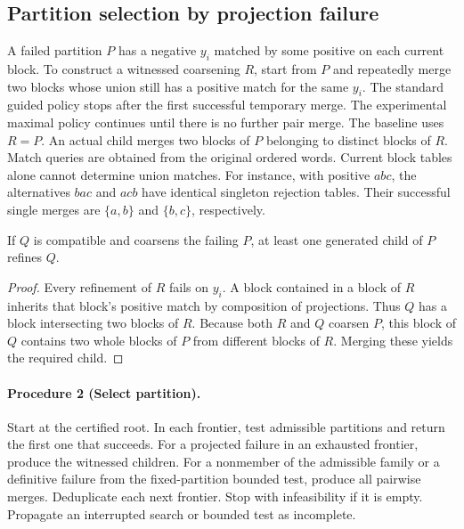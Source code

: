 \subsection{Partition selection by projection failure}

A failed partition \(P\) has a negative \(y_i\) matched by some
positive on each current block. To construct a witnessed coarsening
\(R\), start from \(P\) and repeatedly merge two blocks whose union
still has a positive match for the same \(y_i\). The standard guided
policy stops after the first successful temporary merge. The
experimental maximal policy continues until there is no further
pair merge. The baseline uses \(R=P\). An actual child merges two
blocks of \(P\) belonging to distinct blocks of \(R\).
Match queries are obtained from the original ordered words. Current
block tables alone cannot determine union matches. For instance,
with positive \(abc\), the alternatives \(bac\) and \(acb\) have
identical singleton rejection tables. Their successful single merges
are \(\{a,b\}\) and \(\{b,c\}\), respectively.

\begin{lemma}
If \(Q\) is compatible and coarsens the failing \(P\), at least one
generated child of \(P\) refines \(Q\).
\end{lemma}
\begin{proof}
Every refinement of \(R\) fails on \(y_i\). A block contained in a
block of \(R\) inherits that block's positive match by composition
of projections. Thus \(Q\) has a block intersecting two blocks of
\(R\). Because both \(R\) and \(Q\) coarsen \(P\), this block of
\(Q\) contains two whole blocks of \(P\) from different blocks of
\(R\). Merging these yields the required child.
\end{proof}

\paragraph{Procedure 2 (Select partition).}
Start at the certified root. In each frontier, test admissible
partitions and return the first one that succeeds. For a projected
failure in an exhausted frontier, produce the witnessed children.
For a nonmember of the admissible family or a definitive failure
from the fixed-partition bounded test, produce all pairwise merges.
Deduplicate each next frontier. Stop with infeasibility if it is
empty. Propagate an interrupted search or bounded test as incomplete.

